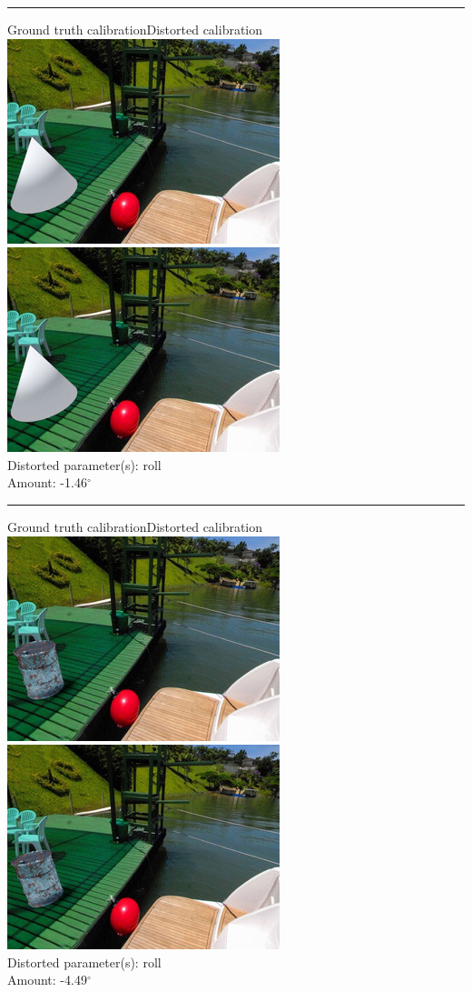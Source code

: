 \begin{minipage}{\linewidth}
\centering
\hrule\vspace{1em}
Ground truth calibration\hspace{0.2\linewidth}Distorted calibration\\\vspace{0.5em}
\includegraphics[width=0.45\linewidth]{study/thumb/pano_ahxngxlbcrplaw-6_3_gt.jpg}
\includegraphics[width=0.45\linewidth]{study/thumb/pano_ahxngxlbcrplaw-6_3_dc.jpg}\\
Distorted parameter(s): roll\\
Amount: -1.46$^\circ$
\end{minipage}

\begin{minipage}{\linewidth}
\centering
\hrule\vspace{1em}
Ground truth calibration\hspace{0.2\linewidth}Distorted calibration\\\vspace{0.5em}
\includegraphics[width=0.45\linewidth]{study/thumb/pano_ahxngxlbcrplaw-6_4_gt.jpg}
\includegraphics[width=0.45\linewidth]{study/thumb/pano_ahxngxlbcrplaw-6_4_dc.jpg}\\
Distorted parameter(s): roll\\
Amount: -4.49$^\circ$
\end{minipage}

